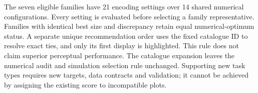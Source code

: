 \documentclass[10pt]{article}
\begin{document}
The seven eligible families have 21 encoding settings over 14 shared numerical configurations. Every setting is evaluated before selecting a family representative. Families with identical best size and discrepancy retain equal numerical-optimum status. A separate unique recommendation order uses the fixed catalogue ID to resolve exact ties, and only its first display is highlighted. This rule does not claim superior perceptual performance. The catalogue expansion leaves the numerical audit and simulation selection rule unchanged. Supporting new task types requires new targets, data contracts and validation; it cannot be achieved by assigning the existing score to incompatible plots.

\clearpage\begingroup\small\endgroup
\end{document}

